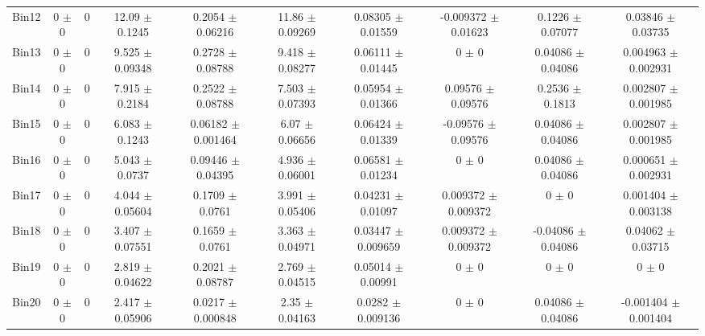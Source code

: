 \begin{tabular}{@{\extracolsep{4pt}}lccccccccc@{}}
     Bin12 & 0 $\pm$ 0 & 0 & 12.09 $\pm$ 0.1245 & 0.2054 $\pm$ 0.06216 & 11.86 $\pm$ 0.09269 & 0.08305 $\pm$ 0.01559 & -0.009372 $\pm$ 0.01623 & 0.1226 $\pm$ 0.07077 & 0.03846 $\pm$ 0.03735 \\ 
     Bin13 & 0 $\pm$ 0 & 0 & 9.525 $\pm$ 0.09348 & 0.2728 $\pm$ 0.08788 & 9.418 $\pm$ 0.08277 & 0.06111 $\pm$ 0.01445 & 0 $\pm$ 0 & 0.04086 $\pm$ 0.04086 & 0.004963 $\pm$ 0.002931 \\ 
     Bin14 & 0 $\pm$ 0 & 0 & 7.915 $\pm$ 0.2184 & 0.2522 $\pm$ 0.08788 & 7.503 $\pm$ 0.07393 & 0.05954 $\pm$ 0.01366 & 0.09576 $\pm$ 0.09576 & 0.2536 $\pm$ 0.1813 & 0.002807 $\pm$ 0.001985 \\ 
     Bin15 & 0 $\pm$ 0 & 0 & 6.083 $\pm$ 0.1243 & 0.06182 $\pm$ 0.001464 & 6.07 $\pm$ 0.06656 & 0.06424 $\pm$ 0.01339 & -0.09576 $\pm$ 0.09576 & 0.04086 $\pm$ 0.04086 & 0.002807 $\pm$ 0.001985 \\ 
     Bin16 & 0 $\pm$ 0 & 0 & 5.043 $\pm$ 0.0737 & 0.09446 $\pm$ 0.04395 & 4.936 $\pm$ 0.06001 & 0.06581 $\pm$ 0.01234 & 0 $\pm$ 0 & 0.04086 $\pm$ 0.04086 & 0.000651 $\pm$ 0.002931 \\ 
     Bin17 & 0 $\pm$ 0 & 0 & 4.044 $\pm$ 0.05604 & 0.1709 $\pm$ 0.0761 & 3.991 $\pm$ 0.05406 & 0.04231 $\pm$ 0.01097 & 0.009372 $\pm$ 0.009372 & 0 $\pm$ 0 & 0.001404 $\pm$ 0.003138 \\ 
     Bin18 & 0 $\pm$ 0 & 0 & 3.407 $\pm$ 0.07551 & 0.1659 $\pm$ 0.0761 & 3.363 $\pm$ 0.04971 & 0.03447 $\pm$ 0.009659 & 0.009372 $\pm$ 0.009372 & -0.04086 $\pm$ 0.04086 & 0.04062 $\pm$ 0.03715 \\ 
     Bin19 & 0 $\pm$ 0 & 0 & 2.819 $\pm$ 0.04622 & 0.2021 $\pm$ 0.08787 & 2.769 $\pm$ 0.04515 & 0.05014 $\pm$ 0.00991 & 0 $\pm$ 0 & 0 $\pm$ 0 & 0 $\pm$ 0 \\ 
     Bin20 & 0 $\pm$ 0 & 0 & 2.417 $\pm$ 0.05906 & 0.0217 $\pm$ 0.000848 & 2.35 $\pm$ 0.04163 & 0.0282 $\pm$ 0.009136 & 0 $\pm$ 0 & 0.04086 $\pm$ 0.04086 & -0.001404 $\pm$ 0.001404 \\ 
\hline\hline
  \end{tabular}

